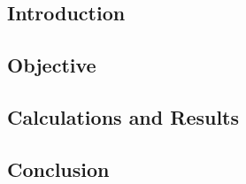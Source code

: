 \subsection{Introduction}

\subsection{Objective}

\subsection{Calculations and Results}

\subsection{Conclusion}
